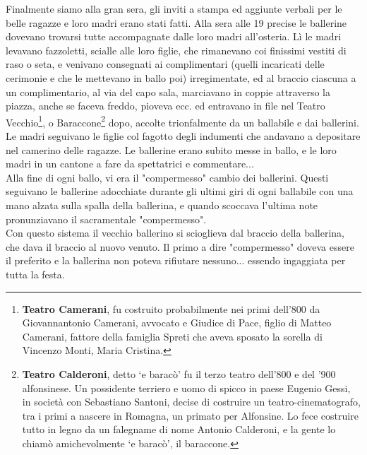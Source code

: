 \indent Finalmente siamo alla gran sera, gli inviti a stampa ed aggiunte verbali per le belle ragazze e loro madri erano stati fatti. Alla sera alle 19 precise le ballerine dovevano trovarsi tutte accompagnate dalle loro madri all'osteria. Lì le madri levavano fazzoletti, scialle alle loro figlie, che rimanevano coi finissimi vestiti di raso o seta, e venivano consegnati ai complimentari (quelli incaricati delle cerimonie e che le mettevano in ballo poi) irregimentate, ed al braccio ciascuna a un complimentario, al via del capo sala, marciavano in coppie attraverso la piazza, anche se faceva freddo, pioveva ecc. ed entravano in file nel Teatro Vecchio\footnote{\textbf{Teatro Camerani}, fu costruito probabilmente nei primi dell'800 da Giovannantonio Camerani, avvocato e Giudice di Pace, figlio di Matteo Camerani, fattore della famiglia Spreti che aveva sposato la sorella di Vincenzo Monti, Maria Cristina.}, o Baraccone\footnote{\textbf{Teatro Calderoni}, detto `e baracò' fu il terzo teatro dell'800 e del '900 alfonsinese. Un possidente terriero e uomo di spicco in paese Eugenio Gessi, in società con Sebastiano Santoni, decise di costruire un teatro-cinematografo, tra i primi a nascere in Romagna, un primato per Alfonsine. Lo fece costruire tutto in legno da un falegname di nome Antonio Calderoni, e la gente lo chiamò amichevolmente `e baracò', il baraccone.} dopo, accolte trionfalmente da un ballabile e dai ballerini.\\
\indent Le madri seguivano le figlie col fagotto degli indumenti che andavano a depositare nel camerino delle ragazze. Le ballerine erano subito messe in ballo, e le loro madri in un cantone a fare da spettatrici e commentare...\\
\indent Alla fine di ogni ballo, vi era il "compermesso" cambio dei ballerini. Questi seguivano le ballerine adocchiate durante gli ultimi giri di ogni ballabile con una mano alzata sulla spalla della ballerina, e quando scoccava l'ultima note pronunziavano il sacramentale "compermesso".\\
\indent Con questo sistema il vecchio ballerino si scioglieva dal braccio della ballerina, che dava il braccio al nuovo venuto. Il primo a dire "compermesso" doveva essere il preferito e la ballerina non poteva rifiutare nessuno... essendo ingaggiata per tutta la festa.\\
